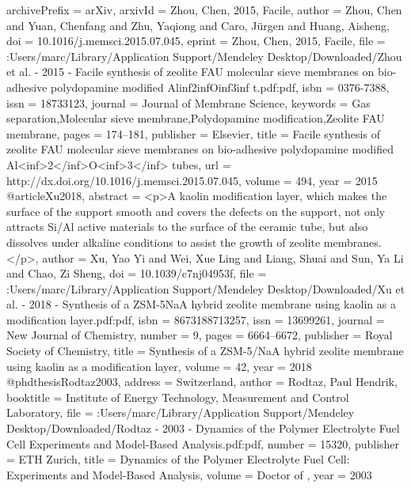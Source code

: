 {archivePrefix = {arXiv},
arxivId = {Zhou, Chen, 2015, Facile},
author = {Zhou, Chen and Yuan, Chenfang and Zhu, Yaqiong and Caro, J{\"{u}}rgen and Huang, Aisheng},
doi = {10.1016/j.memsci.2015.07.045},
eprint = {Zhou, Chen, 2015, Facile},
file = {:Users/marc/Library/Application Support/Mendeley Desktop/Downloaded/Zhou et al. - 2015 - Facile synthesis of zeolite FAU molecular sieve membranes on bio-adhesive polydopamine modified Alinf2infOinf3inf t.pdf:pdf},
isbn = {0376-7388},
issn = {18733123},
journal = {Journal of Membrane Science},
keywords = {Gas separation,Molecular sieve membrane,Polydopamine modification,Zeolite FAU membrane},
pages = {174--181},
publisher = {Elsevier},
title = {{Facile synthesis of zeolite FAU molecular sieve membranes on bio-adhesive polydopamine modified Al{\textless}inf{\textgreater}2{\textless}/inf{\textgreater}O{\textless}inf{\textgreater}3{\textless}/inf{\textgreater} tubes}},
url = {http://dx.doi.org/10.1016/j.memsci.2015.07.045},
volume = {494},
year = {2015}
}
@article{Xu2018,
abstract = {{\textless}p{\textgreater}A kaolin modification layer, which makes the surface of the support smooth and covers the defects on the support, not only attracts Si/Al active materials to the surface of the ceramic tube, but also dissolves under alkaline conditions to assist the growth of zeolite membranes.{\textless}/p{\textgreater}},
author = {Xu, Yao Yi and Wei, Xue Ling and Liang, Shuai and Sun, Ya Li and Chao, Zi Sheng},
doi = {10.1039/c7nj04953f},
file = {:Users/marc/Library/Application Support/Mendeley Desktop/Downloaded/Xu et al. - 2018 - Synthesis of a ZSM-5NaA hybrid zeolite membrane using kaolin as a modification layer.pdf:pdf},
isbn = {8673188713257},
issn = {13699261},
journal = {New Journal of Chemistry},
number = {9},
pages = {6664--6672},
publisher = {Royal Society of Chemistry},
title = {{Synthesis of a ZSM-5/NaA hybrid zeolite membrane using kaolin as a modification layer}},
volume = {42},
year = {2018}
}
@phdthesis{Rodtaz2003,
address = {Switzerland},
author = {Rodtaz, Paul Hendrik},
booktitle = {Institute of Energy Technology, Measurement and Control Laboratory},
file = {:Users/marc/Library/Application Support/Mendeley Desktop/Downloaded/Rodtaz - 2003 - Dynamics of the Polymer Electrolyte Fuel Cell Experiments and Model-Based Analysis.pdf:pdf},
number = {15320},
publisher = {ETH Zurich},
title = {{Dynamics of the Polymer Electrolyte Fuel Cell: Experiments and Model-Based Analysis}},
volume = {Doctor of },
year = {2003}
}
